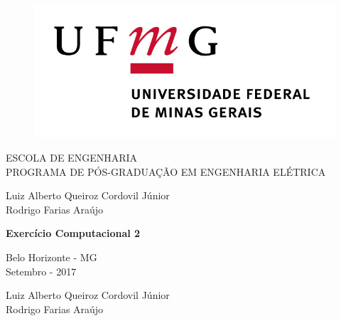 \documentclass[12pt,a4paper]{article}
\numberwithin{equation}{section}
\begin{document}

\thispagestyle{empty}

  \begin{figure}[!htb]
    \centering
    \includegraphics[scale=0.2]{ufmg.jpg}
    \label{figRotulo}
  \end{figure}

\vspace{3 mm}
\begin{center}
{ESCOLA DE ENGENHARIA}\\
{PROGRAMA DE PÓS-GRADUAÇÃO EM ENGENHARIA ELÉTRICA}\\
\end{center}

\vspace{15mm}
\begin{center}
Luiz Alberto Queiroz Cordovil Júnior \\
Rodrigo Farias Araújo
\end{center}

\vspace{50 mm}
\begin{center}
\textbf{Exercício Computacional 2}\\
\end{center}

\vspace{30 mm}

\vspace{60mm}
\begin{center}
Belo Horizonte - MG\\
Setembro - 2017
\end{center}
\thispagestyle{empty}
\newpage


\thispagestyle{empty}

\vspace{3 mm}
\begin{center}
Luiz Alberto Queiroz Cordovil Júnior \\
Rodrigo Farias Araújo
\end{center}
\end{document}
